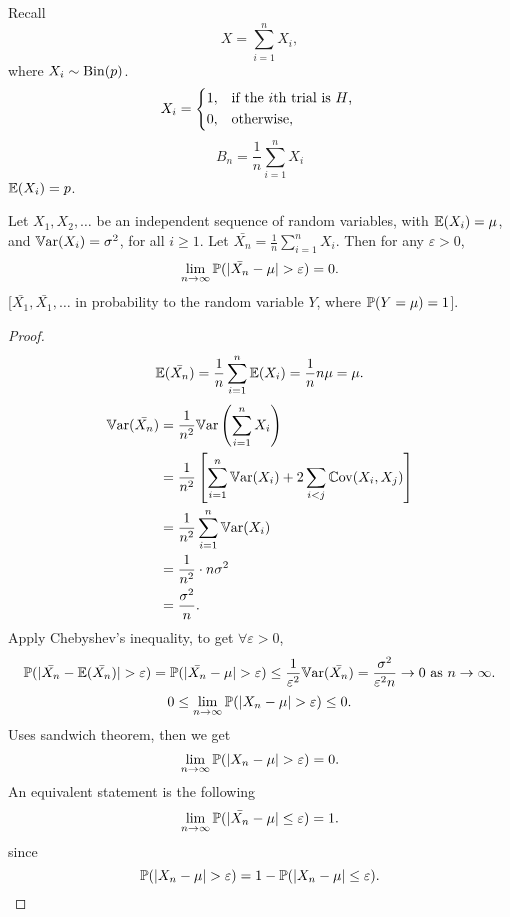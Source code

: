 \documentclass[10pt, a4paper]{article}
\begin{document}
Recall
\[
X = \sum_{i = 1}^{n}X_i,
\]
where $X_i \sim \Bin(p)$.
\[
X_i = \begin{dcases*}
    1, & if the $i$th trial is $H$, \\
    0, & otherwise,
\end{dcases*}
\]
\[
B_n = \frac{1}{n}\sum_{i = 1}^{n}X_i
\]
$\E(X_i) = p$.
\begin{theorem}
    Let $X_1, X_2, \dotsc$ be an independent sequence of random variables,
    with $\E(X_i) = \mu$,
    and $\Var(X_i) = \sigma ^ 2$,
    for all $i \geq 1$.
    Let $\bar{X_n} = \frac{1}{n}\sum_{i = 1}^{n}X_i$.
    Then for any $\varepsilon > 0$,
    \[
    \lim_{n \rightarrow \infty}\P(|\bar{X_n} - \mu| > \varepsilon) = 0.
    \]
    [$\bar{X_1}, \bar{X_1}, \dotsc$ in probability to the random variable $Y$,
    where $\P(Y = \mu) = 1$].

    \begin{proof}
        \[
        \E(\bar{X_n}) = \frac{1}{n}\sum_{i = 1}^{n}\E(X_i) = \frac{1}{n}n\mu = \mu.
        \]
        \begin{align*}
            \Var(\bar{X_n}) &= \frac{1}{n ^ 2}\Var\left(\sum_{i = 1}^{n}X_i\right) \\
            &= \frac{1}{n ^ 2}\left[\sum_{i = 1}^{n}\Var(X_i) + 2 \sum_{i < j}\Cov(X_i, X_j)\right] \\
            &= \frac{1}{n ^ 2}\sum_{i = 1}^{n}\Var(X_i) \\
            &= \frac{1}{n ^ 2} \cdot n \sigma ^ 2 \\
            &= \frac{\sigma ^ 2}{n}.
        \end{align*}
        Apply Chebyshev's inequality,
        to get $\forall \varepsilon > 0$,
        \[
        \P(|\bar{X_n} - \E(\bar{X_n})| > \varepsilon) = \P(|\bar{X_n} - \mu| > \varepsilon) \leq \frac{1}{\varepsilon ^ 2}\Var(\bar{X_n}) = \frac{\sigma ^ 2}{\varepsilon ^ 2 n} \rightarrow 0 \text{ as } n \rightarrow \infty.
        \]
        \[
        0 \leq \lim_{n \rightarrow \infty}\P(|X_n - \mu| > \varepsilon) \leq 0.
        \]
        Uses sandwich theorem,
        then we get
        \[
        \lim_{n \rightarrow \infty}\P(|X_n - \mu| > \varepsilon) = 0.
        \]
        An equivalent statement is the following
        \[
        \lim_{n \rightarrow \infty}\P(|\bar{X_n} - \mu| \leq \varepsilon) = 1.
        \]
        since
        \[
        \P(|X_n - \mu| > \varepsilon) = 1 - \P(|X_n - \mu| \leq \varepsilon).
        \]
    \end{proof}
\end{theorem}
\end{document}

